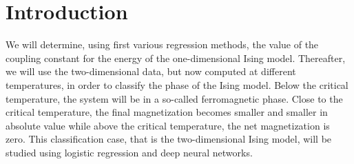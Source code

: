 \section{Introduction}\label{sec:Introduction}
We will determine, using first various regression methods, the value of the coupling constant for the energy of the one-dimensional Ising model. Thereafter, we will use the two-dimensional data, but now computed at different temperatures, in order to classify the phase of the Ising model. Below the critical temperature, the system will be in a so-called ferromagnetic phase. Close to the critical temperature, the final magnetization becomes smaller and smaller in absolute value while above the critical temperature, the net magnetization is zero. This classification case, that is the two-dimensional Ising model, will be studied using logistic regression and deep neural networks.